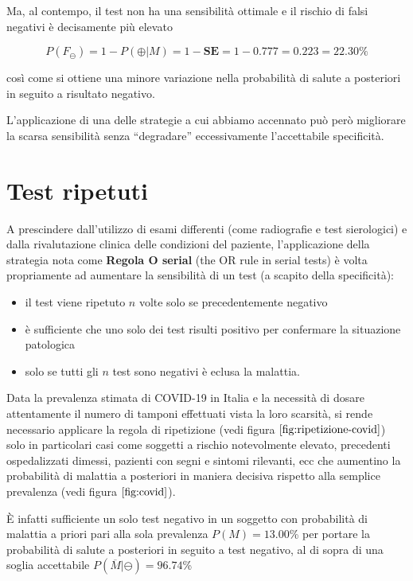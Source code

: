 \documentclass[11pt]{article}
\providecommand{\tightlist}{%
      \setlength{\itemsep}{0pt}\setlength{\parskip}{0pt}}
\begin{document}
Ma, al contempo, il test non ha una sensibilità ottimale e il rischio di
falsi negativi è decisamente più elevato

    \[
P(F_{\ominus}) = 1 - P(\oplus|M) = 1 - \mathbf{SE} = 1 - 0.777 = 0.223 = 22.30\%
\]

    
    così come si ottiene una minore variazione nella probabilità di salute a
posteriori in seguito a risultato negativo.

L'applicazione di una delle strategie a cui abbiamo accennato può però
migliorare la scarsa sensibilità senza ``degradare'' eccessivamente
l'accettabile specificità.

    \hypertarget{test-ripetuti}{%
\section{Test ripetuti}\label{test-ripetuti}}

A prescindere dall'utilizzo di esami differenti (come radiografie e test
sierologici) e dalla rivalutazione clinica delle condizioni del
paziente, l'applicazione della strategia nota come \textbf{Regola O
serial} (the OR rule in serial tests) è volta propriamente ad aumentare
la sensibilità di un test (a scapito della specificità):

\begin{itemize}
\tightlist
\item
  il test viene ripetuto \(n\) volte solo se precedentemente negativo
\item
  è suﬀiciente che uno solo dei test risulti positivo per confermare la
  situazione patologica
\item
  solo se tutti gli \(n\) test sono negativi è eclusa la malattia.
\end{itemize}

Data la prevalenza stimata di COVID-19 in Italia e la necessità di
dosare attentamente il numero di tamponi effettuati vista la loro
scarsità, si rende necessario applicare la regola di ripetizione (vedi
figura \(\ref{fig:ripetizione-covid}\)) solo in particolari casi come
soggetti a rischio notevolmente elevato, precedenti ospedalizzati
dimessi, pazienti con segni e sintomi rilevanti, ecc che aumentino la
probabilità di malattia a posteriori in maniera decisiva rispetto alla
semplice prevalenza (vedi figura \(\ref{fig:covid}\)).

    È infatti sufficiente un solo test negativo in un soggetto con
probabilità di malattia a priori pari alla sola prevalenza
\(P(M)=13.00\)\% per portare la probabilità di salute a posteriori in
seguito a test negativo, al di sopra di una soglia accettabile
\(P(\overline{M}|\ominus) = 96.74\)\%
\end{document}
